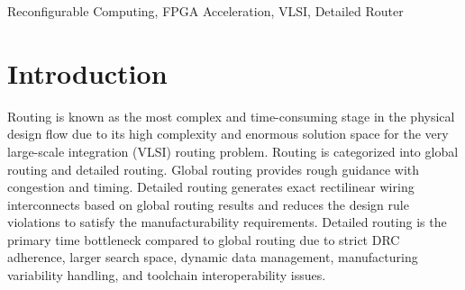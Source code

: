 \documentclass[conference]{IEEEtran}
\begin{document}
\begin{abstract}
The semiconductor industry keeps seeking for reducing the design time and efforts in modern integrated circuit implementation, 
while detailed routing is a dead-or-alive critical element in design automation tooling for advanced node enablement, 
which is known as the most time-consuming step in the back-end design flow due to its high complexity and enormous solution space for the very large-scale integration (VLSI) routing problem.

In this paper, we propose a FPGA-based implementation to accelerate the detailed routers, uses efficient memory access management and parallelism to achieve better performance.
Experimental results demonstrate that detailed routers obtain stable and effective acceleration on FPGA. 
Our design gets 2.1$\times$-2.3$\times$, 2.1$\times$-2.5$\times$, 1.3$\times$ speedup compared to TritonRoute, Dr.CU,and current optimum routing kernel acceleration work, 
also obtains 20\% speedup for  detailed routing flow, and 1.0$\times$-1.2$\times$ resource utilization compared to TritonRoute.
\end{abstract}

\begin{IEEEkeywords}
Reconfigurable Computing, FPGA Acceleration, VLSI, Detailed Router
\end{IEEEkeywords}

\section{Introduction}
Routing is known as the most complex and time-consuming stage in the physical design flow 
due to its high complexity and enormous solution space for the very large-scale integration (VLSI) routing problem. 
Routing is categorized into global routing and detailed routing. Global routing provides rough guidance with congestion and timing. 
Detailed routing generates exact rectilinear wiring interconnects based on global routing results and 
reduces the design rule violations to satisfy the manufacturability requirements. 
Detailed routing is the primary time bottleneck compared to global routing 
due to strict DRC adherence, larger search space, dynamic data management, manufacturing variability handling, and toolchain interoperability issues.
\end{document}
